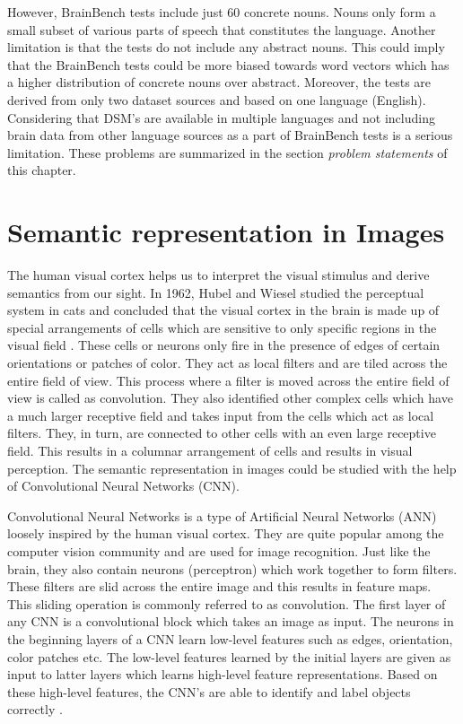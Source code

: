 However, BrainBench tests include just 60 concrete nouns.  Nouns only form a small subset of various parts of speech that constitutes the language. Another limitation is that the tests do not include any abstract nouns. This could imply that the BrainBench tests could be more biased towards word vectors which has a higher distribution of concrete nouns over abstract. Moreover, the tests are derived from only two dataset sources and based on one language (English). Considering that DSM's are available in multiple languages and not including brain data from other language sources as a part of BrainBench tests is a serious limitation. These problems are summarized in the section \textit{problem statements} of this chapter.



\section{Semantic representation in Images}

The human visual cortex helps us to interpret the visual stimulus and derive semantics from our sight. In 1962, Hubel and Wiesel studied the perceptual system in cats and concluded that the visual cortex in the brain is made up of special arrangements of cells which are sensitive to only specific regions in the visual field \cite{Hubel992}. These cells or neurons only fire in the presence of edges of certain orientations or patches of color. They act as local filters and are tiled across the entire field of view. This process where a filter is moved across the entire field of view is called as convolution. They also identified other complex cells which have a much larger receptive field and takes input from the cells which act as local filters. They, in turn, are connected to other cells with an even large receptive field. This results in a columnar arrangement of cells and results in visual perception. The semantic representation in images could be studied with the help of Convolutional Neural Networks (CNN).

Convolutional Neural Networks is a type of Artificial Neural Networks (ANN) loosely inspired by the human visual cortex.  They are quite popular among the computer vision community and are used for image recognition. Just like the brain, they also contain neurons (perceptron) which work together to form filters. These filters are slid across the entire image and this results in feature maps. This sliding operation is commonly referred to as convolution. The first layer of any CNN is a convolutional block which takes an image as input. The neurons in the beginning layers of a CNN learn low-level features such as edges, orientation, color patches etc. The low-level features learned by the initial layers are given as input to latter layers which learns high-level feature representations. Based on these high-level features, the CNN's are able to identify and label objects correctly  \cite{CNNREF1}\cite{CNNREF2}.

